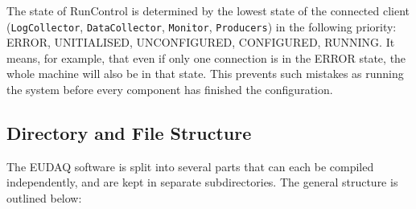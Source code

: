 The state of RunControl is determined by the lowest state of the connected client (\texttt{LogCollector}, \texttt{DataCollector}, \texttt{Monitor}, \texttt{Producers}) in the following priority: ERROR, UNITIALISED, UNCONFIGURED, CONFIGURED, RUNNING. It means, for example, that even if only one connection is in the ERROR state, the whole machine will also be in that state. This prevents such mistakes as running the system before every component has finished the configuration.


\subsection{Directory and File Structure}
The EUDAQ software is split into several parts that can each be compiled independently,
and are kept in separate subdirectories.
The general structure is outlined below:

